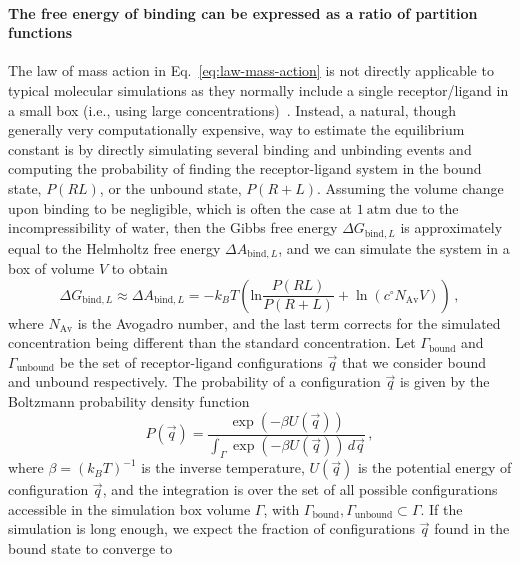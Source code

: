 \documentclass[9pt,bestpractices]{livecoms}
\begin{document}
\paragraph{The free energy of binding can be expressed as a ratio of partition functions}
The law of mass action in Eq.~\ref{eq:law-mass-action} is not directly applicable to typical molecular simulations as they normally include a single receptor/ligand in a small box (i.e., using large concentrations)~\cite{jong2011determining}.
Instead, a natural, though generally very computationally expensive, way to estimate the equilibrium constant is by directly simulating several binding and unbinding events and computing the probability of finding the receptor-ligand system in the bound state, $P(RL)$, or the unbound state, $P(R+L)$.
Assuming the volume change upon binding to be negligible, which is often the case at $1~\mathrm{atm}$ due to the incompressibility of water, then the Gibbs free energy $\Delta G_{\mathrm{bind}, L}$ is approximately equal to the Helmholtz free energy $\Delta A_{\mathrm{bind}, L}$, and we can simulate the system in a box of volume $V$ to obtain~\cite{jong2011determining}
\begin{equation}\label{eq:binding-free-energy-from-bound-unbound-probability-ratio}
    \Delta G_{\mathrm{bind},L} \approx \Delta A_{\mathrm{bind}, L} = - k_B T  \left( \mathrm{ln} \frac{P(RL)}{P(R+L)} + \ln \left( c^\circ N_{\mathrm{Av}} V \right) \right) \, ,
\end{equation}
where $N_{\mathrm{Av}}$ is the Avogadro number, and the last term corrects for the simulated concentration being different than the standard concentration.
Let $\Gamma_{\mathrm{bound}}$ and $\Gamma_{\mathrm{unbound}}$ be the set of receptor-ligand configurations $\vec{q}$ that we consider bound and unbound respectively.
The probability of a configuration $\vec{q}$ is given by the Boltzmann probability density function
\begin{equation}
    P(\vec{q}) = \frac{\exp\left( -\beta U(\vec{q}) \right)}{\int_{\Gamma} \exp\left( -\beta U(\vec{q}) \right) \, d\vec{q}} \, ,
    \label{eq:conf_probability}
\end{equation}
where $\beta = (k_B T)^{-1}$ is the inverse temperature, $U(\vec{q})$ is the potential energy of configuration $\vec{q}$, and the integration is over the set of all possible configurations accessible in the simulation box volume $\Gamma$, with $\Gamma_{\mathrm{bound}},\Gamma_{\mathrm{unbound}} \subset \Gamma$.
If the simulation is long enough, we expect the fraction of configurations $\vec{q}$ found in the bound state to converge to
\end{document}
